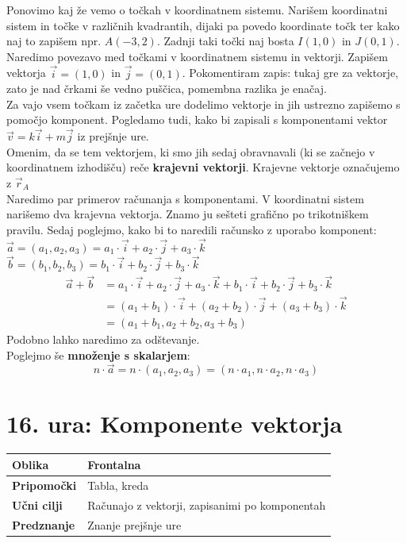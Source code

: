 \documentclass[a4paper,11pt]{article}
\begin{document}
Ponovimo kaj že vemo o točkah v koordinatnem sistemu. Narišem koordinatni sistem in točke v različnih kvadrantih, dijaki pa povedo koordinate točk ter kako naj to zapišem npr. $A(-3,2)$. Zadnji taki točki naj bosta $I(1,0)$ in $J(0,1)$.\\
Naredimo povezavo med točkami v koordinatnem sistemu in vektorji. Zapišem vektorja $\vec{i}=(1,0)$ in $\vec{j}=(0,1)$. Pokomentiram zapis: tukaj gre za vektorje, zato je nad črkami še vedno puščica, pomembna razlika je enačaj. \\
Za vajo vsem točkam iz začetka ure dodelimo vektorje in jih ustrezno zapišemo s pomočjo komponent. Pogledamo tudi, kako bi zapisali s komponentami vektor $\vec{v}=k\vec{i}+m\vec{j}$ iz prejšnje ure. \\
Omenim, da se tem vektorjem, ki smo jih sedaj obravnavali (ki se začnejo v koordinatnem izhodišču) reče \textbf{krajevni vektorji}. Krajevne vektorje označujemo z $\vec{r}_A$\\

Naredimo par primerov računanja s komponentami. V koordinatni sistem narišemo dva krajevna vektorja. Znamo ju sešteti grafično po trikotniškem pravilu. Sedaj poglejmo, kako bi to naredili računsko z uporabo komponent:\\

\noindent $\vec{a}=(a_1,a_2,a_3)= a_1\cdot\vec{i}+a_2\cdot\vec{j}+a_3\cdot\vec{k}$\\
$\vec{b}=(b_1, b_2,b_3)=b_1\cdot\vec{i}+b_2\cdot\vec{j}+b_3\cdot\vec{k}$\\
\begin{align*}
\vec{a}+\vec{b}
    &= a_1\cdot\vec{i}+a_2\cdot\vec{j}+a_3\cdot\vec{k}
      +b_1\cdot\vec{i}+b_2\cdot\vec{j}+b_3\cdot\vec{k} \\
    &= (a_1+b_1)\cdot\vec{i}
      +(a_2+b_2)\cdot\vec{j}
      +(a_3+b_3)\cdot\vec{k}\\
    &=(a_1+b_1,a_2+b_2,a_3+b_3)
\end{align*}
Podobno lahko naredimo za odštevanje.\\
Poglejmo še \textbf{množenje s skalarjem}:
$$n\cdot\vec{a}=n\cdot(a_1,a_2,a_3)=(n\cdot a_1,n\cdot a_2, n\cdot a_3)$$

\newpage
\section{16. ura: Komponente vektorja}
\begin{tabularx}{\textwidth}{|>{\bfseries\RaggedRight}p{2.7cm}|X|}
\hline
Oblika & Frontalna \\ \hline
Pripomočki & Tabla, kreda \\ \hline
Učni cilji & Računajo z vektorji, zapisanimi po komponentah \\ \hline
Predznanje & Znanje prejšnje ure\\ \hline
\end{tabularx}
\\
\end{document}

